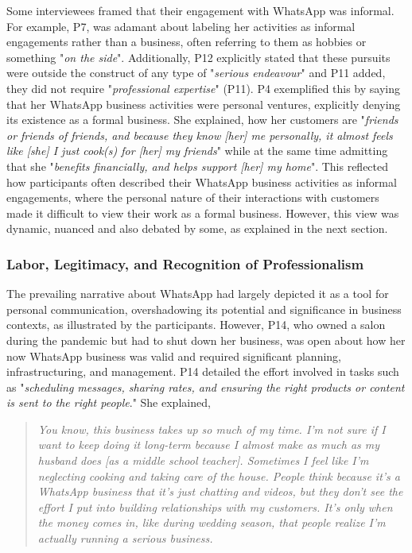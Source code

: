 Some interviewees framed that their engagement with WhatsApp was informal. For example, P7, was adamant about labeling her activities as informal engagements rather than a business, often referring to them as hobbies or something "\textit{on the side}". Additionally, P12 explicitly stated that these pursuits were outside the construct of any type of "\textit{serious endeavour}" and P11 added, they did not require "\textit{professional expertise}" (P11). P4 exemplified this by saying that her WhatsApp business activities were personal ventures, explicitly denying its existence as a formal business. She explained, how her customers are "\textit{friends or friends of friends, and because they know [her] me personally, it almost feels like [she] I just cook(s) for [her] my friends}" while at the same time admitting that she "\textit{benefits financially, and helps support [her] my home}". This reflected how participants often described their WhatsApp business activities as informal engagements, where the personal nature of their interactions with customers made it difficult to view their work as a formal business. However, this view was dynamic, nuanced and also debated by some, as explained in the next section. 


\subsubsection{Labor, Legitimacy, and Recognition of Professionalism}


The prevailing narrative about WhatsApp had largely depicted it as a tool for personal communication, overshadowing its potential and significance in business contexts, as illustrated by the participants. However, P14, who owned a salon during the pandemic but had to shut down her business, was open about how her now WhatsApp business was valid and required significant planning, infrastructuring, and management. P14 detailed the effort involved in tasks such as "\textit{scheduling messages, sharing rates, and ensuring the right products or content is sent to the right people}." She explained, 

\begin{quote}
   \textit{You know, this business takes up so much of my time. I’m not sure if I want to keep doing it long-term because I almost make as much as my husband does [as a middle school teacher]. Sometimes I feel like I’m neglecting cooking and taking care of the house. People think because it’s a WhatsApp business that it’s just chatting and videos, but they don’t see the effort I put into building relationships with my customers. It’s only when the money comes in, like during wedding season, that people realize I’m actually running a serious business.}
\end{quote}

